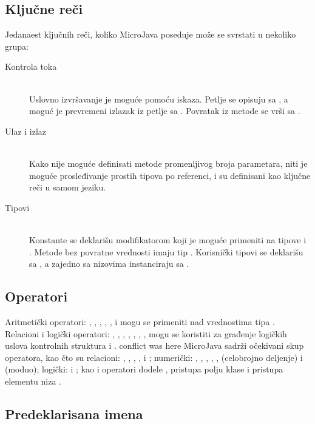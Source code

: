 \subsection*{Ključne reči}

Jedanaest ključnih reči, koliko MicroJava poseduje može se svrstati u nekoliko grupa:

\begin{description}
    \item[Kontrola toka] \hfill \\
    Uslovno izvršavanje je moguće pomoću  iskaza. 
    Petlje se opisuju sa , a moguć je prevremeni izlazak iz petlje sa . 
    Povratak iz metode se vrši sa .

   \item[Ulaz i izlaz] \hfill \\
	Kako nije moguće definisati metode promenljivog broja parametara, niti je moguće prosleđivanje prostih tipova po referenci,  i  su definisani kao ključne reči u samom jeziku.

	\item[Tipovi] \hfill \\
	Konstante se deklarišu modifikatorom  koji je moguće primeniti na tipove  i .
	Metode bez povratne vrednosti imaju tip . 
	Korisnički tipovi se deklarišu sa , a zajedno sa nizovima instanciraju sa .

\end{description}


\subsection*{Operatori}

Aritmetički operatori: \mj{+}, \mj{-}, \mj{*}, \mj{\%}, \mj{/}, \mj{++} i \mj{--} mogu se primeniti nad vrednostima tipa .
Relacioni i logički operatori: \mj{==}, \mj{>}, \mj{<}, \mj{>=}, \mj{<=}, \mj{!=}, \mj{\&\&}, \mj{||} mogu se koristiti za građenje logičkih uslova kontrolnih struktura  i .
conflict was here 
MicroJava sadrži očekivani skup operatora, kao čto su relacioni: \mj{<}, \mj{>}, \mj{==}, \mj{<=}, \mj{>=} i \mj{!=}; 
numerički: \mj{+}, \mj{++}, \mj{-}, \mj{--}, \mj{*}, \mj{/} (celobrojno deljenje) i \mj{\%} (moduo); 
logički: \mj{\&\&} i \mj{||}; 
kao i operatori dodele \mj{=}, pristupa polju klase  i pristupa elementu niza \mj{[]}.

\subsection*{Predeklarisana imena}


